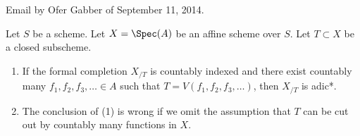 %
\begin{lemma}
\label{lemma-completion-countably-indexed}
\begin{reference}
Email by Ofer Gabber of September 11, 2014.
\end{reference}
Let $S$ be a scheme. Let $X = \Spec(A)$ be an affine scheme over $S$.
Let $T \subset X$ be a closed subscheme.
\begin{enumerate}
\item If the formal completion $X_{/T}$ is countably indexed
and there exist countably many $f_1, f_2, f_3, \ldots \in A$ such that
$T = V(f_1, f_2, f_3, \ldots)$, then $X_{/T}$ is adic*.
\item The conclusion of (1) is wrong if we omit the assumption that
$T$ can be cut out by countably many functions in $X$.
\end{enumerate}
\end{lemma}


